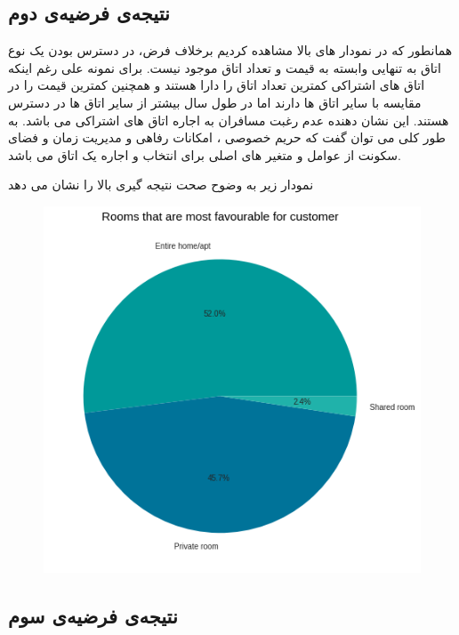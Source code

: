 \documentclass[table]{article}
\begin{document}
	\subsection{نتیجه‌ی فرضیه‌ی دوم}
	همانطور که در نمودار های بالا مشاهده کردیم برخلاف فرض، در دسترس بودن یک نوع اتاق به تنهایی وابسته به قیمت و تعداد اتاق موجود نیست. برای نمونه علی رغم اینکه اتاق های اشتراکی کمترین تعداد اتاق را دارا هستند و همچنین کمترین قیمت را در مقایسه با سایر اتاق ها دارند اما در طول سال بیشتر از سایر اتاق ها در دسترس هستند. این نشان دهنده عدم رغبت مسافران به اجاره اتاق های اشتراکی می باشد. به طور کلی می توان گفت که حریم خصوصی ، امکانات رفاهی و مدیریت زمان و فضای سکونت از عوامل و متغیر های اصلی برای انتخاب و اجاره یک اتاق می باشد.
	
	نمودار زیر به وضوح صحت نتیجه گیری بالا را نشان می دهد
	
	\begin{figure}[h!]
		\centering
		\includegraphics[scale=.5]{./graph8.png}
		\caption{}
	\end{figure}

\newpage
	\subsection{نتیجه‌ی فرضیه‌ی سوم}
	\begin{LTR}
		
	\end{LTR}
	
\end{document}
